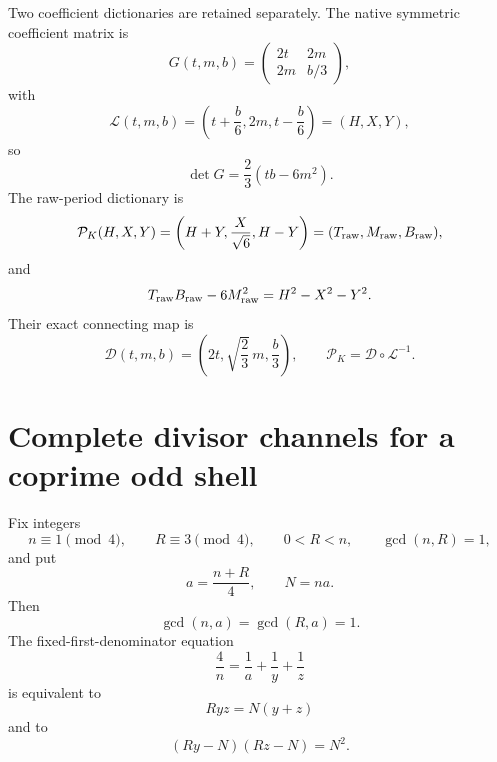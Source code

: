 \documentclass[11pt]{article}
\theoremstyle{definition}
\theoremstyle{remark}
\newcommand{\1}{\mathbf 1}
\newcommand{\mat}[4]{\begin{pmatrix}#1&#2\\#3&#4\end{pmatrix}}
\begin{document}
Two coefficient dictionaries are retained separately.  The native symmetric
coefficient matrix is
\begin{equation}\label{eq:native-G}
 G(t,m,b)=\mat{2t}{2m}{2m}{b/3},
\end{equation}
with
\begin{equation}\label{eq:L-native}
 \mathcal L(t,m,b)=\left(t+\frac b6,2m,t-\frac b6\right)=(H,X,Y),
\end{equation}
so
\begin{equation}\label{eq:native-disc}
 \det G=\frac23(tb-6m^2).
\end{equation}
The raw-period dictionary is
\begin{equation}\label{eq:raw-dict}
 \mathcal P_K(H,X,Y)=\left(H+Y,\frac X{\sqrt6},H-Y\right)
 =(T_{\rm raw},M_{\rm raw},B_{\rm raw}),
\end{equation}
and
\begin{equation}\label{eq:raw-disc}
 T_{\rm raw}B_{\rm raw}-6M_{\rm raw}^2=H^2-X^2-Y^2.
\end{equation}
Their exact connecting map is
\begin{equation}\label{eq:D-map}
 \mathcal D(t,m,b)=\left(2t,\sqrt{\frac23}\,m,\frac b3\right),
 \qquad \mathcal P_K=\mathcal D\circ\mathcal L^{-1}.
\end{equation}

\section{Complete divisor channels for a coprime odd shell}

Fix integers
\begin{equation}\label{eq:general-shell-hyp}
 n\equiv1\pmod4,\qquad R\equiv3\pmod4,
 \qquad 0<R<n,\qquad \gcd(n,R)=1,
\end{equation}
and put
\begin{equation}\label{eq:aN}
 a=\frac{n+R}{4},\qquad N=na.
\end{equation}
Then
\begin{equation}\label{eq:gcd-general}
 \gcd(n,a)=\gcd(R,a)=1.
\end{equation}
The fixed-first-denominator equation
\begin{equation}\label{eq:fixed-shell-ES}
 \frac4n=\frac1a+\frac1y+\frac1z
\end{equation}
is equivalent to
\begin{equation}\label{eq:residual-equation}
 Ryz=N(y+z)
\end{equation}
and to
\begin{equation}\label{eq:shifted-factorization}
 (Ry-N)(Rz-N)=N^2.
\end{equation}
\end{document}
